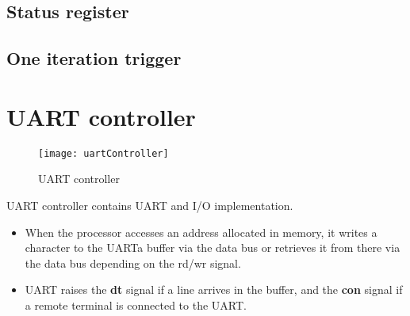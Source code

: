 \subsection*{Status register}

\subsection*{One iteration trigger}

\section*{UART controller}

\begin{figure}[ht]
	\centering
	\texttt{[image: uartController]}
	\caption{UART controller}
\end{figure}

UART controller contains UART and I/O implementation.

\begin{itemize}
	\item When the processor accesses an address allocated in memory, it writes a character to the UARTa buffer via the data bus or retrieves it from there via the data bus depending on the rd/wr signal.
	\item UART raises the \textbf{dt} signal if a line arrives in the buffer, and the \textbf{con} signal if a remote terminal is connected to the UART.
\end{itemize}
